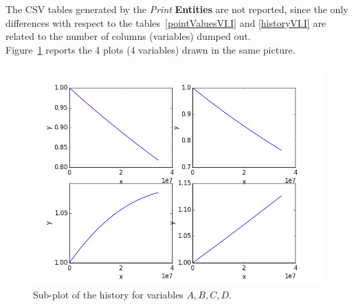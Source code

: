 The CSV tables generated by the \textit{Print} \textbf{Entities} are not reported, since the only differences with respect to the  tables~\ref{pointValuesVI.I} and \ref{historyVI.I} are related to the number of columns (variables)
dumped out. 
\\Figure~\ref{fig:historySubPlotLine} reports the 4 plots (4 variables) drawn in the same picture. 
 \begin{figure}[h!]
  \centering
  \includegraphics[scale=0.7]{pics/1-historyPlot_line-line-line-line-subPlots.png}
  \caption{Sub-plot of the history for variables $A,B,C,D$.}
  \label{fig:historySubPlotLine}
 \end{figure}

